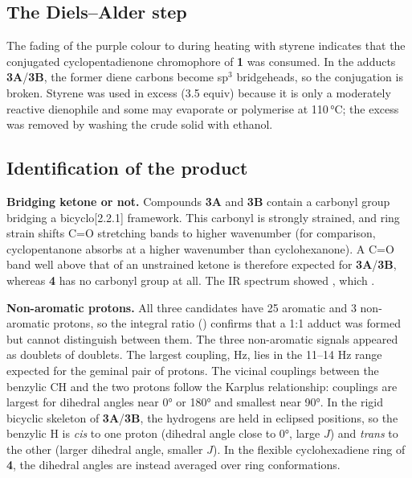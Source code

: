 \documentclass[11pt,a4paper]{article}
\begin{document}
\subsection{The Diels--Alder step}
The fading of the purple colour to  during heating with styrene indicates that the conjugated cyclopentadienone chromophore of \textbf{1} was consumed. In the adducts \textbf{3A}/\textbf{3B}, the former diene carbons become sp$^3$ bridgeheads, so the conjugation is broken. Styrene was used in excess (3.5 equiv) because it is only a moderately reactive dienophile and some may evaporate or polymerise at 110\,\si{\celsius}; the excess was removed by washing the crude solid with ethanol.

\subsection{Identification of the product}
\textbf{Bridging ketone or not.} Compounds \textbf{3A} and \textbf{3B} contain a carbonyl group bridging a bicyclo[2.2.1] framework. This carbonyl is strongly strained, and ring strain shifts C=O stretching bands to higher wavenumber (for comparison, cyclopentanone absorbs at a higher wavenumber than cyclohexanone).\cite{Pavia} A C=O band well above that of an unstrained ketone is therefore expected for \textbf{3A}/\textbf{3B}, whereas \textbf{4} has no carbonyl group at all. The IR spectrum showed , which .

\textbf{Non-aromatic protons.} All three candidates have 25 aromatic and 3 non-aromatic protons, so the integral ratio () confirms that a 1:1 adduct was formed but cannot distinguish between them. The three non-aromatic signals appeared as doublets of doublets. The largest coupling,  Hz, lies in the 11--14 Hz range expected for the geminal pair of  protons.\cite{Manual2026} The vicinal couplings between the benzylic CH and the two  protons follow the Karplus relationship:\cite{Karplus1959} couplings are largest for dihedral angles near 0\si{\degree} or 180\si{\degree} and smallest near 90\si{\degree}. In the rigid bicyclic skeleton of \textbf{3A}/\textbf{3B}, the hydrogens are held in eclipsed positions, so the benzylic H is \emph{cis} to one  proton (dihedral angle close to 0\si{\degree}, large $J$) and \emph{trans} to the other (larger dihedral angle, smaller $J$). In the flexible cyclohexadiene ring of \textbf{4}, the dihedral angles are instead averaged over ring conformations. 
\end{document}

